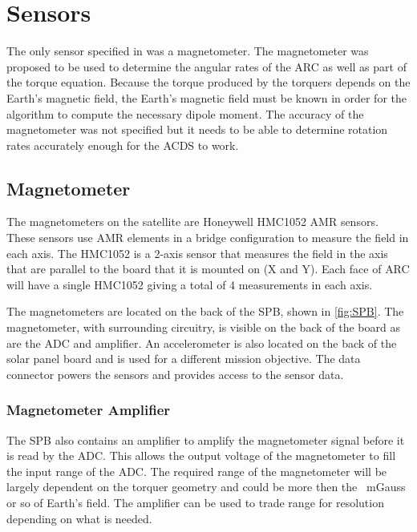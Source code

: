 

\section{Sensors}

The only sensor specified in \cite{Mentch11} was a magnetometer. The magnetometer was proposed to be used to determine the angular rates of the \ac{ARC} as well as part of the torque equation. Because the torque produced by the torquers depends on the Earth's magnetic field, the Earth's magnetic field must be known in order for the algorithm to compute the necessary dipole moment. The accuracy of the magnetometer was not specified but it needs to be able to determine rotation rates accurately enough for the \ac{ACDS} to work.

\subsection{Magnetometer}

The magnetometers on the satellite are Honeywell HMC1052 \ac{AMR} sensors. These sensors use \ac{AMR} elements in a bridge configuration to measure the field in each axis. The HMC1052 is a 2-axis sensor that measures the field in the axis that are parallel to the board that it is mounted on (X and Y). Each face of \ac{ARC} will have a single HMC1052 giving a total of 4 measurements in each axis.

The magnetometers are located on the back of the \acs{SPB}, shown in \cref{fig:SPB}. The magnetometer, with surrounding circuitry, is visible on the back of the board as are the \ac{ADC} and amplifier. An accelerometer is also located on the back of the solar panel board and is used for a different mission objective. The data connector powers the sensors and provides access to the sensor data.

\subsubsection{Magnetometer Amplifier}

The \ac{SPB} also contains an amplifier to amplify the magnetometer signal before it is read by the \ac{ADC}. This allows the output voltage of the magnetometer to fill the input range of the \ac{ADC}. The required range of the magnetometer will be largely dependent on the torquer geometry and could be more then the ~mGauss or so of Earth's field. The amplifier can be used to trade range for resolution depending on what is needed.

